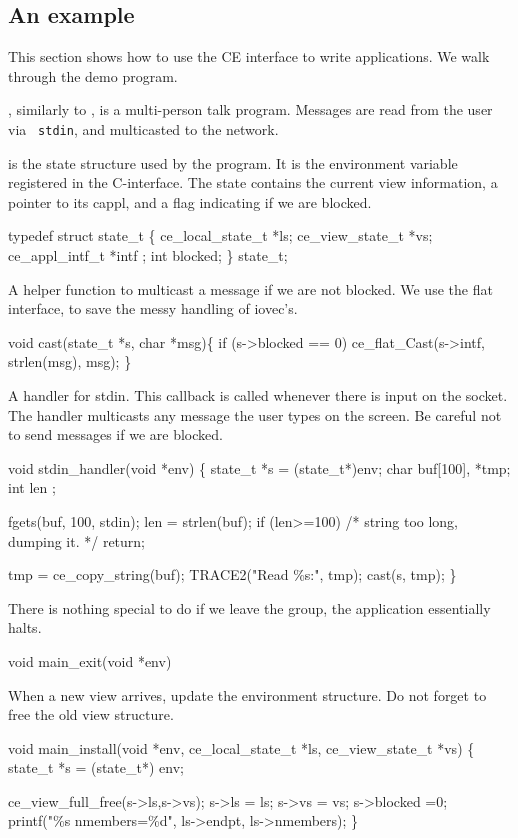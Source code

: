 \subsection{An example}

This section shows how to use the CE interface to write applications. 
We walk through the  demo program.

, similarly to ,
is a multi-person talk program. Messages are read from the user via {\tt
stdin}, and multicasted to the network.

 is the state structure used by the program. It is the
environment variable registered in the C-interface. The state contains
the current view information, a pointer to its cappl, and a flag
indicating if we are blocked.
\begin{codebox}
typedef struct state_t \{
  ce_local_state_t *ls;
  ce_view_state_t *vs;
  ce_appl_intf_t *intf ;
  int blocked;
\} state_t;
\end{codebox}


A helper function to multicast a message if we are not blocked. 
We use the flat interface, to save the messy handling of iovec's.
\begin{codebox}
void cast(state_t *s, char *msg)\{
  if (s->blocked == 0)
    ce_flat_Cast(s->intf, strlen(msg), msg);
\}
\end{codebox}
 

A handler for stdin. This callback is called whenever there is input
on the socket. The handler multicasts any message the user types on the
screen. Be careful not to send messages if we are blocked.
\begin{codebox}
void stdin_handler(void *env) \{
  state_t *s = (state_t*)env;
  char buf[100], *tmp;
  int len ;
  
  fgets(buf, 100, stdin);
  len = strlen(buf);
  if (len>=100)
    /* string too long, dumping it.
     */
    return;

  tmp = ce_copy_string(buf);
  TRACE2("Read \%s:", tmp);
  cast(s, tmp);
\}
\end{codebox}


There is nothing special to do if we leave the group, the application
essentially halts.
\begin{codebox}
void main_exit(void *env){}
\end{codebox}

When a new view arrives, update the environment structure. Do not
forget to free the old view structure. 
\begin{codebox}
void main_install(void *env, ce_local_state_t *ls, ce_view_state_t *vs) \{
  state_t *s = (state_t*) env;

  ce_view_full_free(s->ls,s->vs);
  s->ls = ls;
  s->vs = vs;
  s->blocked =0;
  printf("\%s nmembers=\%d", ls->endpt, ls->nmembers);
\}
\end{codebox}

